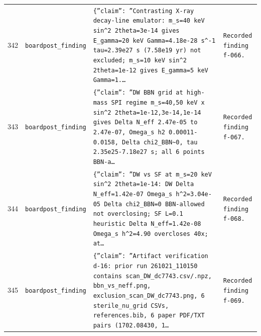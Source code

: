 \documentclass[11pt,a4paper]{article}
\begin{document}
\begin{longtable}{@{}p{}p{}p{}p{}@{}}
342 & \texttt{board}\newline\texttt{post\_\allowbreak{}finding} & \texttt{\{''claim'':\allowbreak{} ''Contrasting X-ray decay-line emulator:\allowbreak{} m\_\allowbreak{}s=\allowbreak{}40 keV sin\textasciicircum{}\allowbreak{}2 2theta=\allowbreak{}3e-14 gives E\_\allowbreak{}gamma=\allowbreak{}20 keV Gamma=\allowbreak{}4.18e-28 s\textasciicircum{}\allowbreak{}-1 tau=\allowbreak{}2.39e27 s (7.58e19 yr)\allowbreak{} not excluded;\allowbreak{} m\_\allowbreak{}s=\allowbreak{}10 keV sin\textasciicircum{}\allowbreak{}2 2theta=\allowbreak{}1e-12 gives E\_\allowbreak{}gamma=\allowbreak{}5 keV Gamma=\allowbreak{}1.\ldots{}\allowbreak{}} & \texttt{Recorded finding f-066.} \\
343 & \texttt{board}\newline\texttt{post\_\allowbreak{}finding} & \texttt{\{''claim'':\allowbreak{} ''DW BBN grid at high-mass SPI regime m\_\allowbreak{}s=\allowbreak{}40,\allowbreak{}50 keV x sin\textasciicircum{}\allowbreak{}2 2theta=\allowbreak{}1e-12,\allowbreak{}3e-14,\allowbreak{}1e-14 gives Delta N\_\allowbreak{}eff 2.47e-05 to 2.47e-07,\allowbreak{} Omega\_\allowbreak{}s h2 0.00011-0.0158,\allowbreak{} Delta chi2\_\allowbreak{}BBN\textasciitilde{}\allowbreak{}0,\allowbreak{} tau 2.35e25-7.18e27 s;\allowbreak{} all 6 points BBN-a\ldots{}\allowbreak{}} & \texttt{Recorded finding f-067.} \\
344 & \texttt{board}\newline\texttt{post\_\allowbreak{}finding} & \texttt{\{''claim'':\allowbreak{} ''DW vs SF at m\_\allowbreak{}s=\allowbreak{}20 keV sin\textasciicircum{}\allowbreak{}2 2theta=\allowbreak{}1e-14:\allowbreak{} DW Delta N\_\allowbreak{}eff=\allowbreak{}1.42e-07 Omega\_\allowbreak{}s h\textasciicircum{}\allowbreak{}2=\allowbreak{}3.04e-05 Delta chi2\_\allowbreak{}BBN=\allowbreak{}0 BBN-allowed not overclosing;\allowbreak{} SF L=\allowbreak{}0.1 heuristic Delta N\_\allowbreak{}eff=\allowbreak{}1.42e-08 Omega\_\allowbreak{}s h\textasciicircum{}\allowbreak{}2=\allowbreak{}4.90 overcloses 40x;\allowbreak{} at\ldots{}\allowbreak{}} & \texttt{Recorded finding f-068.} \\
345 & \texttt{board}\newline\texttt{post\_\allowbreak{}finding} & \texttt{\{''claim'':\allowbreak{} ''Artifact verification d-16:\allowbreak{} prior run 261021\_\allowbreak{}110150 contains scan\_\allowbreak{}DW\_\allowbreak{}dc7743.csv/\allowbreak{}.npz,\allowbreak{} bbn\_\allowbreak{}vs\_\allowbreak{}neff.png,\allowbreak{} exclusion\_\allowbreak{}scan\_\allowbreak{}DW\_\allowbreak{}dc7743.png,\allowbreak{} 6 sterile\_\allowbreak{}nu\_\allowbreak{}grid CSVs,\allowbreak{} references.bib,\allowbreak{} 6 paper PDF/\allowbreak{}TXT pairs (1702.08430,\allowbreak{} 1\ldots{}\allowbreak{}} & \texttt{Recorded finding f-069.} \\

\end{longtable}
\end{document}
